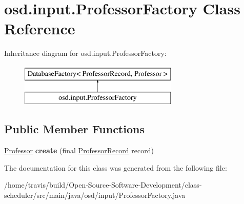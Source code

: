 \hypertarget{classosd_1_1input_1_1_professor_factory}{\section{osd.\-input.\-Professor\-Factory Class Reference}
\label{classosd_1_1input_1_1_professor_factory}
}
Inheritance diagram for osd.\-input.\-Professor\-Factory\-:\begin{figure}[H]
\begin{center}
\leavevmode
\includegraphics[height=2.000000cm]{classosd_1_1input_1_1_professor_factory}
\end{center}
\end{figure}
\subsection*{Public Member Functions}
\begin{DoxyCompactItemize}
\item 
\hypertarget{classosd_1_1input_1_1_professor_factory_a2ac185fdaf67e1ca4eeb86cd4209c277}{\hyperlink{interfaceosd_1_1input_1_1_professor}{Professor} {\bfseries create} (final \hyperlink{classosd_1_1database_1_1_professor_record}{Professor\-Record} record)}\label{classosd_1_1input_1_1_professor_factory_a2ac185fdaf67e1ca4eeb86cd4209c277}

\end{DoxyCompactItemize}


The documentation for this class was generated from the following file\-:\begin{DoxyCompactItemize}
\item 
/home/travis/build/\-Open-\/\-Source-\/\-Software-\/\-Development/class-\/scheduler/src/main/java/osd/input/Professor\-Factory.\-java\end{DoxyCompactItemize}
